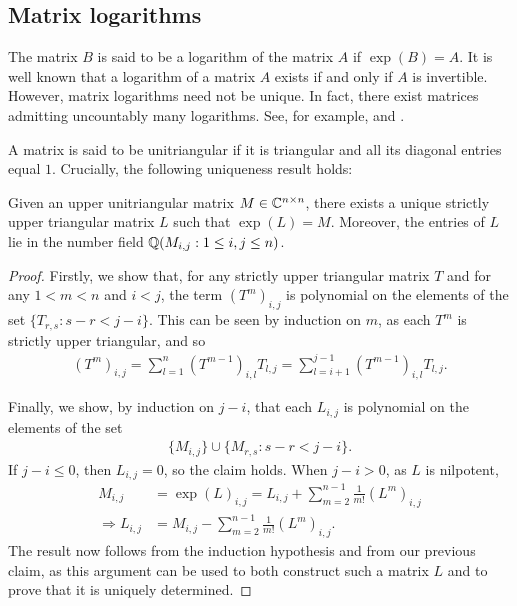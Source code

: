 \subsection{Matrix logarithms}

The matrix $B$ is said to be a logarithm of the matrix $A$ if $\exp(B) = A$. It is well known that a logarithm of a matrix $A$ exists if and only if $A$ is invertible. However, matrix logarithms need not be unique. In fact, there exist matrices admitting uncountably many logarithms. See, for example, \cite{MatrixLogs1} and \cite{MatrixLogs2}.

A matrix is said to be unitriangular if it is triangular and all its diagonal entries equal $1$. Crucially, the following uniqueness result holds:

\begin{theorem}
\label{thm:log_uniqueness}
Given an upper unitriangular matrix $M \in \mathbb{C}^{n \times n}$, there exists a unique strictly upper triangular matrix $L$ such that $\exp(L)=M$. Moreover, the entries of $L$ lie in the number field $\mathbb{Q}(M_{i,j}: 1 \leq i,j \leq n)$.
\end{theorem}

\begin{proof}
Firstly, we show that, for any strictly upper triangular matrix $T$ and for any $1<m<n$ and $i<j$, the term $(T^{m})_{i,j}$ is polynomial on the elements of the set $\lbrace T_{r,s} : s-r<j-i \rbrace$. This can be seen by induction on $m$, as each $T^{m}$ is strictly upper triangular, and so
\begin{align*}
(T^{m})_{i,j} = \sum\limits_{l=1}^{n} (T^{m-1})_{i,l} T_{l,j} = \sum\limits_{l=i+1}^{j-1} (T^{m-1})_{i,l} T_{l,j} .
\end{align*}

Finally, we show, by induction on $j-i$, that each $L_{i,j}$ is polynomial on the elements of the set
\begin{align*}
\lbrace M_{i,j} \rbrace \cup \lbrace M_{r,s} : s-r < j-i \rbrace .
\end{align*}
If $j-i \leq 0$, then $L_{i,j}=0$, so the claim holds. When $j-i>0$, as $L$ is nilpotent,
\begin{align*}
M_{i,j} &= \exp(L)_{i,j} = L_{i,j} + \sum\limits_{m=2}^{n-1} \frac{1}{m!} (L^{m})_{i,j} \\ \Rightarrow L_{i,j} &= M_{i,j} - \sum\limits_{m=2}^{n-1} \frac{1}{m!} (L^{m})_{i,j} .
\end{align*}
The result now follows from the induction hypothesis and from our previous claim, as this argument can be used to both construct such a matrix $L$ and to prove that it is uniquely determined.
\end{proof}
